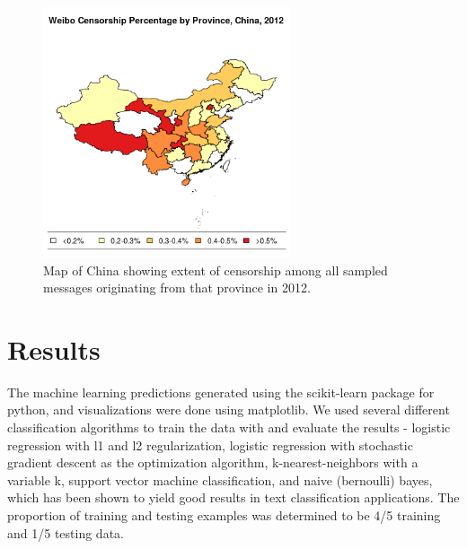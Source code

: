 \documentclass{article} %
\begin{document}
\begin{CJK*}{UTF8}{gbsn}
\begin{figure}[!htb]
	\begin{center}
	\includegraphics[width=0.65\textwidth, height = 0.4\textheight]{./data/chinaplot}
	\end{center}
\caption{Map of China showing extent of censorship among all sampled messages originating from that province in 2012.}
\vspace{-10pt}
\end{figure}

\section{Results}

The machine learning predictions generated using the scikit-learn package for python, and visualizations were done using matplotlib. We used several different classification algorithms to train the data with and evaluate the results - logistic regression with l1 and l2 regularization, logistic regression with stochastic gradient descent as the optimization algorithm, k-nearest-neighbors with a variable k, support vector machine classification, and naive (bernoulli) bayes, which has been shown to yield good results in text classification applications. The proportion of training and testing examples was determined to be 4/5 training and 1/5 testing data. 


\end{CJK*}
\end{document}
